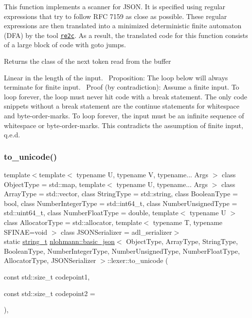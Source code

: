 This function implements a scanner for J\+S\+ON. It is specified using regular expressions that try to follow R\+FC 7159 as close as possible. These regular expressions are then translated into a minimized deterministic finite automaton (D\+FA) by the tool \href{http://re2c.org}{\tt re2c}. As a result, the translated code for this function consists of a large block of code with {\ttfamily goto} jumps.

\begin{DoxyReturn}{Returns}
the class of the next token read from the buffer
\end{DoxyReturn}
Linear in the length of the input.~\newline
 Proposition\+: The loop below will always terminate for finite input.~\newline
 Proof (by contradiction)\+: Assume a finite input. To loop forever, the loop must never hit code with a {\ttfamily break} statement. The only code snippets without a {\ttfamily break} statement are the continue statements for whitespace and byte-\/order-\/marks. To loop forever, the input must be an infinite sequence of whitespace or byte-\/order-\/marks. This contradicts the assumption of finite input, q.\+e.\+d. \mbox{\label{classnlohmann_1_1basic__json_1_1lexer_acdda4a686d6b4fdd4fd995d0ff62b27e}} 
\subsubsection{\texorpdfstring{to\+\_\+unicode()}{to\_unicode()}}
{\footnotesize\ttfamily template$<$template$<$ typename U, typename V, typename... Args $>$ class Object\+Type = std\+::map, template$<$ typename U, typename... Args $>$ class Array\+Type = std\+::vector, class String\+Type  = std\+::string, class Boolean\+Type  = bool, class Number\+Integer\+Type  = std\+::int64\+\_\+t, class Number\+Unsigned\+Type  = std\+::uint64\+\_\+t, class Number\+Float\+Type  = double, template$<$ typename U $>$ class Allocator\+Type = std\+::allocator, template$<$ typename T, typename S\+F\+I\+N\+A\+E=void $>$ class J\+S\+O\+N\+Serializer = adl\+\_\+serializer$>$ \\
static \hyperlink{classnlohmann_1_1basic__json_a61f8566a1a85a424c7266fb531dca005}{string\+\_\+t} \hyperlink{classnlohmann_1_1basic__json}{nlohmann\+::basic\+\_\+json}$<$ Object\+Type, Array\+Type, String\+Type, Boolean\+Type, Number\+Integer\+Type, Number\+Unsigned\+Type, Number\+Float\+Type, Allocator\+Type, J\+S\+O\+N\+Serializer $>$\+::lexer\+::to\+\_\+unicode (\begin{DoxyParamCaption}\item[{const std\+::size\+\_\+t}]{codepoint1,  }\item[{const std\+::size\+\_\+t}]{codepoint2 = {} }\end{DoxyParamCaption})\hspace{0.3cm}{\ttfamily [inline]}, {\ttfamily [static]}}



